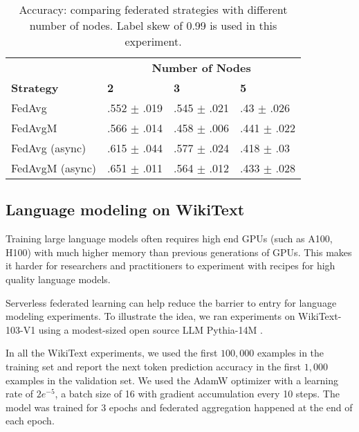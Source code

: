 \documentclass[twocolumn, switch]{article} %
\begin{document}
\begin{table}[ht]
    \centering
    \begin{tabular}{l|lll}
    \toprule
        & \multicolumn{3}{c}{\textbf{Number of Nodes}} \\
        \textbf{Strategy} & \textbf{2} & \textbf{3} & \textbf{5}  \\
        \midrule
        
        FedAvg & .552 $\pm$ .019 & .545 $\pm$ .021 & .43 $\pm$ .026 \\
        FedAvgM & .566 $\pm$ .014 & .458 $\pm$ .006 & .441 $\pm$ .022 \\
        \midrule

        FedAvg (async) & .615 $\pm$ .044 & .577 $\pm$ .024 & .418 $\pm$ .03 \\
        FedAvgM (async) & .651 $\pm$ .011 & .564 $\pm$ .012 & .433 $\pm$ .028 \\
        
        \bottomrule
    \end{tabular}
    \vspace{5pt}
    \caption{Accuracy: comparing federated strategies with different number of nodes. Label skew of 0.99 is used in this experiment.}
    \label{tab:cifar10-0.99}
\end{table}



\subsection{Language modeling on WikiText}

Training large language models often requires high end GPUs (such as A100, H100) with much higher memory than previous generations of GPUs. This makes it harder for researchers and practitioners to experiment with recipes for high quality language models.

Serverless federated learning can help reduce the barrier to entry for language modeling experiments. To illustrate the idea, we ran experiments on WikiText-103-V1 using a modest-sized open source LLM \textrm{Pythia-14M} \cite{pythia}.

In all the WikiText experiments, we used the first $100,000$ examples in the training set and report the next token prediction accuracy in the first $1,000$ examples in the validation set. We used the AdamW \cite{adamw} optimizer with a learning rate of $2e^{-5}$, a batch size of 16 with gradient accumulation every 10 steps. The model was trained for 3 epochs and federated aggregation happened at the end of each epoch.
\end{document}
